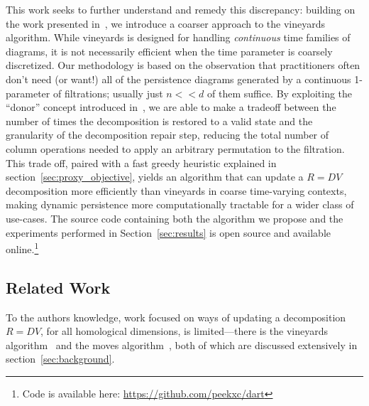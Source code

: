 \documentclass[sn-mathphys]{sn-jnl}
\begin{document}
This work seeks to further understand and remedy this discrepancy: building on the work presented in~\cite{busaryev2010tracking}, we introduce a coarser approach to the vineyards algorithm.
While vineyards is  designed  for handling   \emph{continuous} time families of diagrams, it is not necessarily efficient when the time parameter is coarsely discretized.
Our methodology is based on the observation that practitioners often don't need (or want!) all of the persistence diagrams generated by a continuous 1-parameter of filtrations; usually just $n << d$ of them  suffice.   
By exploiting the ``donor'' concept introduced in~\cite{busaryev2010tracking}, we are able to make a tradeoff between the number of times the decomposition is restored to a valid state and the granularity of the decomposition repair step, reducing the total number of column operations needed to apply an arbitrary permutation to the filtration. This trade off, paired with a fast greedy heuristic explained in section~\ref{sec:proxy_objective}, yields an algorithm that can update a $R = DV$ decomposition more efficiently than vineyards in coarse time-varying contexts, making dynamic persistence more computationally tractable for a wider class of use-cases. 
The source code containing both the algorithm we propose and the experiments performed in Section~\ref{sec:results} is open source and available online.\footnote{ Code is available here: \url{https://github.com/peekxc/dart}}
  
\subsection{Related Work}\label{sec:related_work} 
To the authors knowledge, work focused on ways of updating a  decomposition $R = DV$, for all homological dimensions, is limited---there is the vineyards algorithm~\cite{cohen2006vines} and the moves algorithm~\cite{busaryev2010tracking}, both of which are discussed extensively in section~\ref{sec:background}. 
\end{document}
